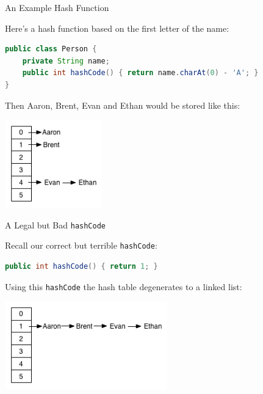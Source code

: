 \documentclass{beamer}
\begin{document}
\begin{frame}[fragile]{An Example Hash Function}

Here's a hash function based on the first letter of the name:
\begin{lstlisting}[language=Java]
public class Person {
    private String name;
    public int hashCode() { return name.charAt(0) - 'A'; }
}
\end{lstlisting}

Then Aaron, Brent, Evan and Ethan would be stored like this:
\begin{center}
\includegraphics[height=1.5in]{hashtable.png}
\end{center}

\end{frame}

\begin{frame}[fragile]{A Legal but Bad {\tt hashCode}}

Recall our correct but terrible {\tt hashCode}:
\begin{lstlisting}[language=Java]
public int hashCode() { return 1; }
\end{lstlisting}

Using this {\tt hashCode} the hash table degenerates to a linked list:

\begin{center}
\includegraphics[height=1.5in]{hashtable-bad.png}
\end{center}

\end{frame}
\end{document}
